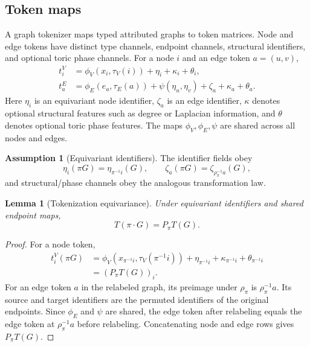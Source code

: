 \documentclass[11pt]{article}
\theoremstyle{definition}
\newtheorem{assumption}[definition]{Assumption}
\theoremstyle{plain}
\newtheorem{lemma}[definition]{Lemma}
\theoremstyle{remark}
\numberwithin{equation}{section}
\begin{document}
\subsection{Token maps}

A graph tokenizer maps typed attributed graphs to token matrices.  Node and edge tokens have distinct type channels, endpoint channels, structural identifiers, and optional toric phase channels.  For a node $i$ and an edge token $a=(u,v)$,
\begin{align}
  t_i^V &= \phi_V(x_i,\tau_V(i)) + \eta_i + \kappa_i + \theta_i,\\
  t_a^E &= \phi_E(e_a,\tau_E(a)) + \psi(\eta_u,\eta_v) + \zeta_a + \kappa_a + \theta_a.
\end{align}
Here $\eta_i$ is an equivariant node identifier, $\zeta_a$ is an edge identifier, $\kappa$ denotes optional structural features such as degree or Laplacian information, and $\theta$ denotes optional toric phase features.  The maps $\phi_V,\phi_E,\psi$ are shared across all nodes and edges.

\begin{assumption}[Equivariant identifiers]
The identifier fields obey
\begin{equation}
  \eta_i(\pi G)=\eta_{\pi^{-1}i}(G),\qquad
  \zeta_a(\pi G)=\zeta_{\rho_\pi^{-1}a}(G),
\end{equation}
and structural/phase channels obey the analogous transformation law.
\end{assumption}

\begin{lemma}[Tokenization equivariance]
Under equivariant identifiers and shared endpoint maps,
\begin{equation}
  T(\pi\cdot G)=P_\pi T(G).
\end{equation}
\end{lemma}

\begin{proof}
For a node token,
\begin{align}
  t_i^V(\pi G)
  &=\phi_V(x_{\pi^{-1}i},\tau_V(\pi^{-1}i))+\eta_{\pi^{-1}i}+\kappa_{\pi^{-1}i}+\theta_{\pi^{-1}i}\\
  &=(P_\pi T(G))_i.
\end{align}
For an edge token $a$ in the relabeled graph, its preimage under $\rho_\pi$ is $\rho_\pi^{-1}a$.  Its source and target identifiers are the permuted identifiers of the original endpoints.  Since $\phi_E$ and $\psi$ are shared, the edge token after relabeling equals the edge token at $\rho_\pi^{-1}a$ before relabeling.  Concatenating node and edge rows gives $P_\pi T(G)$.
\end{proof}
\end{document}
